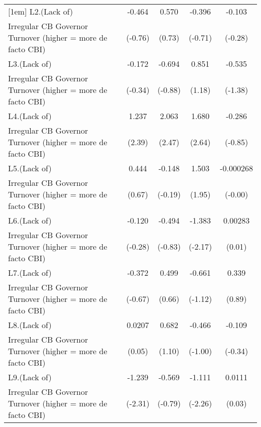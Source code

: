 {\begin{tabular}{l*{4}{c}}
[1em]
L2.(Lack of)        &      -0.464         &       0.570         &      -0.396         &      -0.103         \\
Irregular CB Governor Turnover (higher = more de facto CBI)&     (-0.76)         &      (0.73)         &     (-0.71)         &     (-0.28)         \\
[1em]
L3.(Lack of)        &      -0.172         &      -0.694         &       0.851         &      -0.535         \\
Irregular CB Governor Turnover (higher = more de facto CBI)&     (-0.34)         &     (-0.88)         &      (1.18)         &     (-1.38)         \\
[1em]
L4.(Lack of)        &       1.237\sym{*}  &       2.063\sym{*}  &       1.680\sym{**} &      -0.286         \\
Irregular CB Governor Turnover (higher = more de facto CBI)&      (2.39)         &      (2.47)         &      (2.64)         &     (-0.85)         \\
[1em]
L5.(Lack of)        &       0.444         &      -0.148         &       1.503         &   -0.000268         \\
Irregular CB Governor Turnover (higher = more de facto CBI)&      (0.67)         &     (-0.19)         &      (1.95)         &     (-0.00)         \\
[1em]
L6.(Lack of)        &      -0.120         &      -0.494         &      -1.383\sym{*}  &     0.00283         \\
Irregular CB Governor Turnover (higher = more de facto CBI)&     (-0.28)         &     (-0.83)         &     (-2.17)         &      (0.01)         \\
[1em]
L7.(Lack of)        &      -0.372         &       0.499         &      -0.661         &       0.339         \\
Irregular CB Governor Turnover (higher = more de facto CBI)&     (-0.67)         &      (0.66)         &     (-1.12)         &      (0.89)         \\
[1em]
L8.(Lack of)        &      0.0207         &       0.682         &      -0.466         &      -0.109         \\
Irregular CB Governor Turnover (higher = more de facto CBI)&      (0.05)         &      (1.10)         &     (-1.00)         &     (-0.34)         \\
[1em]
L9.(Lack of)        &      -1.239\sym{*}  &      -0.569         &      -1.111\sym{*}  &      0.0111         \\
Irregular CB Governor Turnover (higher = more de facto CBI)&     (-2.31)         &     (-0.79)         &     (-2.26)         &      (0.03)         \\

\end{tabular}}
